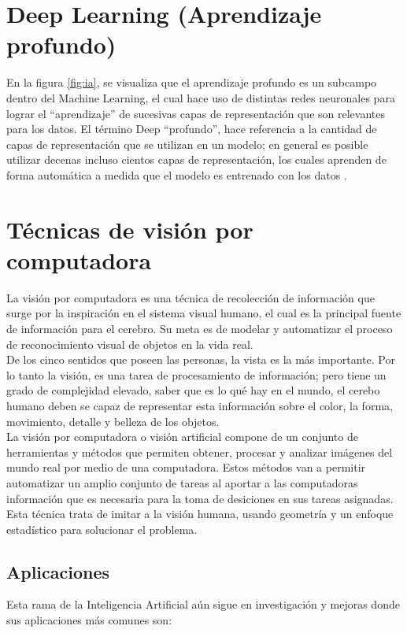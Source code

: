 \section{Deep Learning (Aprendizaje profundo)}
En la figura \ref{fig:ia}, se visualiza que el aprendizaje profundo es un subcampo dentro del Machine Learning, el cual hace uso de distintas redes neuronales para lograr el ``aprendizaje'' de sucesivas capas de representación que son relevantes para los datos. El término Deep ``profundo'', hace referencia a la cantidad de capas de representación que se utilizan en un modelo; en general es posible utilizar decenas incluso cientos capas de representación, los cuales aprenden de forma automática a medida que el modelo es entrenado con los datos \cite{iaarbook:artificialvision}.

\section{Técnicas de visión por computadora}
La visión por computadora es una técnica de recolección de información que surge por la inspiración en el sistema visual humano, el cual es la principal fuente de información para el cerebro. Su meta es de modelar y automatizar el proceso de reconocimiento visual de objetos en la vida real.\\

De los cinco sentidos que poseen las personas, la vista es la más importante. Por lo tanto la visión, es una tarea de procesamiento de información; pero tiene un grado de complejidad elevado, saber que es lo qué hay en el mundo, el cerebo humano deben se capaz de representar esta información sobre el color, la forma, movimiento, detalle y belleza de los objetos. \cite{iaarbook:artificialvision}\\

La visión por computadora o visión artificial compone de un conjunto de herramientas y métodos que permiten obtener, procesar y analizar imágenes del mundo real por medio de una computadora. Estos métodos van a permitir automatizar un amplio conjunto de tareas al aportar a las computadoras información que es necesaria para la toma de desiciones en sus tareas asignadas. Esta técnica trata de imitar a la visión humana, usando geometría y un enfoque estadístico para solucionar el problema.\\

\subsection{Aplicaciones}
Esta rama de la Inteligencia Artificial aún sigue en investigación y mejoras donde sus aplicaciones más comunes son:


